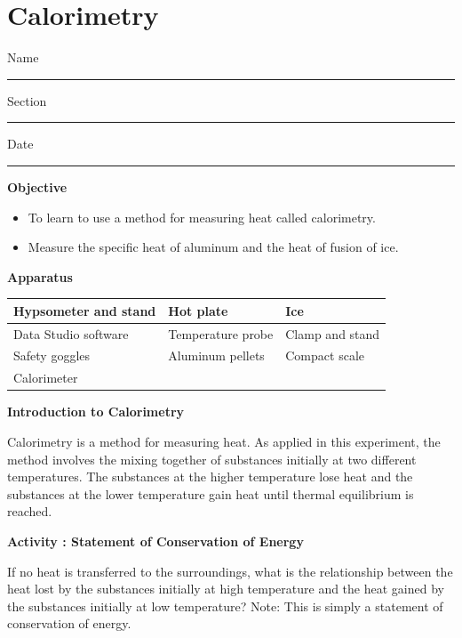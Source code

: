\setcounter{equation}{0}
\setcounter{figure}{0}

\section{Calorimetry}

Name \rule{2.0in}{0.1pt}\hfill{}Section \rule{1.0in}{0.1pt}\hfill{}Date
\rule{1.0in}{0.1pt}

\textbf{Objective}

\begin{itemize}

\item To learn to use a method for measuring heat called calorimetry.

\item Measure the specific heat of aluminum and the heat of fusion of ice.

\end{itemize}

\textbf{Apparatus}

\begin{center}
\begin{tabular}{|l|l|l|} \hline
Hypsometer and stand & Hot plate            & Ice \\ \hline
Data Studio software & Temperature probe    & Clamp and stand \\ \hline
Safety goggles       & Aluminum pellets     & Compact scale           \\ \hline
Calorimeter          &                      &            \\ \hline
\end{tabular}
\end{center}

\textbf{Introduction to Calorimetry} 

Calorimetry is a method for measuring heat. As applied in this experiment,
the method involves the mixing together of substances initially at
two different temperatures. The substances at the higher temperature
lose heat and the substances at the lower temperature gain heat until
thermal equilibrium is reached.

\newpage

\textbf{Activity : Statement of Conservation of Energy}

If no heat is transferred to the surroundings, what is the relationship
between the heat lost by the substances initially at high temperature
and the heat gained by the substances initially at low temperature?
Note: This is simply a statement of conservation of energy.

